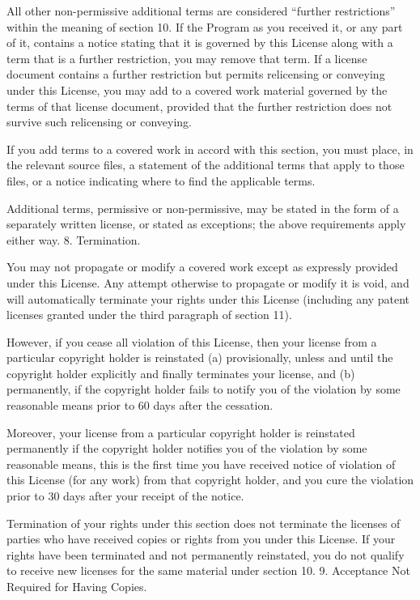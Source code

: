 {\begin{multicols}{4}
All other non-permissive additional terms are considered “further restrictions” within the meaning of section 10. If the Program as you received it, or any part of it, contains a notice stating that it is governed by this License along with a term that is a further restriction, you may remove that term. If a license document contains a further restriction but permits relicensing or conveying under this License, you may add to a covered work material governed by the terms of that license document, provided that the further restriction does not survive such relicensing or conveying.

If you add terms to a covered work in accord with this section, you must place, in the relevant source files, a statement of the additional terms that apply to those files, or a notice indicating where to find the applicable terms.

Additional terms, permissive or non-permissive, may be stated in the form of a separately written license, or stated as exceptions; the above requirements apply either way.
8. Termination.

You may not propagate or modify a covered work except as expressly provided under this License. Any attempt otherwise to propagate or modify it is void, and will automatically terminate your rights under this License (including any patent licenses granted under the third paragraph of section 11).

However, if you cease all violation of this License, then your license from a particular copyright holder is reinstated (a) provisionally, unless and until the copyright holder explicitly and finally terminates your license, and (b) permanently, if the copyright holder fails to notify you of the violation by some reasonable means prior to 60 days after the cessation.

Moreover, your license from a particular copyright holder is reinstated permanently if the copyright holder notifies you of the violation by some reasonable means, this is the first time you have received notice of violation of this License (for any work) from that copyright holder, and you cure the violation prior to 30 days after your receipt of the notice.

Termination of your rights under this section does not terminate the licenses of parties who have received copies or rights from you under this License. If your rights have been terminated and not permanently reinstated, you do not qualify to receive new licenses for the same material under section 10.
9. Acceptance Not Required for Having Copies.


\end{multicols}}
